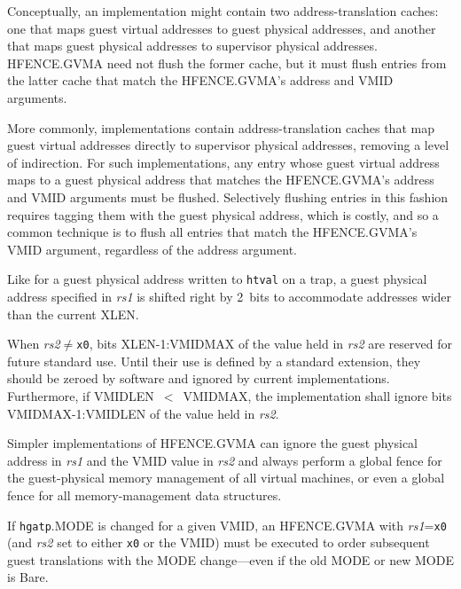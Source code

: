 \begin{commentary}
Conceptually, an implementation might contain two address-translation caches:
one that maps guest virtual addresses to guest physical addresses, and another
that maps guest physical addresses to supervisor physical addresses.
HFENCE.GVMA need not flush the former cache, but it must flush entries from
the latter cache that match the HFENCE.GVMA's address and VMID arguments.

More commonly, implementations contain address-translation caches that map
guest virtual addresses directly to supervisor physical addresses, removing
a level of indirection.
For such implementations, any entry whose guest virtual address maps to
a guest physical address that matches the HFENCE.GVMA's address and VMID
arguments must be flushed.
Selectively flushing entries in this fashion requires tagging them with
the guest physical address, which is costly, and so a common technique is
to flush all entries that match the HFENCE.GVMA's VMID argument, regardless
of the address argument.
\end{commentary}

\begin{commentary}
Like for a guest physical address written to {\tt htval} on a
trap, a guest physical address specified in {\em rs1} is shifted
right by 2~bits to accommodate addresses wider than the current XLEN.
\end{commentary}

When {\em rs2}$\neq${\tt x0}, bits XLEN-1:VMIDMAX of the value held in {\em
rs2} are reserved for future standard use.  Until their use is defined by a
standard extension, they should be zeroed by software and ignored
by current implementations.
Furthermore, if VMIDLEN~$<$~VMIDMAX, the implementation shall ignore bits
VMIDMAX-1:VMIDLEN of the value held in {\em rs2}.

\begin{commentary}
Simpler implementations of HFENCE.GVMA can ignore the guest physical address in
{\em rs1} and the VMID value in {\em rs2} and always perform a global fence for
the guest-physical memory management of all virtual machines, or even a global
fence for all memory-management data structures.
\end{commentary}

If {\tt hgatp}.MODE is changed for a given VMID, an HFENCE.GVMA with
{\em rs1}={\tt x0} (and {\em rs2} set to either {\tt x0} or the VMID) must
be executed to order subsequent guest translations with the MODE
change---even if the old MODE or new MODE is Bare.

